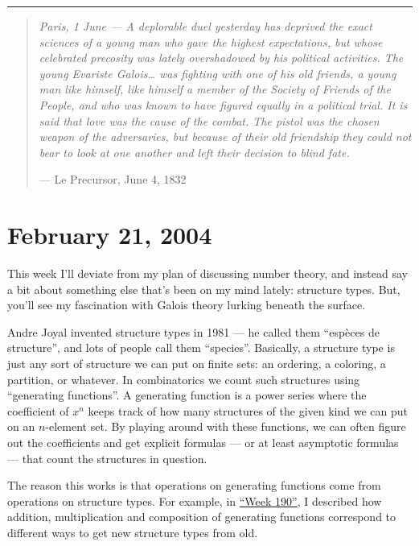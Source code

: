 \documentclass{article}
\begin{document}
\begin{center}\rule{0.5\linewidth}{0.5pt}\end{center}

\begin{quote}
\emph{Paris, 1 June --- A deplorable duel yesterday has deprived the
exact sciences of a young man who gave the highest expectations, but
whose celebrated precosity was lately overshadowed by his political
activities. The young Evariste Galois\ldots{} was fighting with one of
his old friends, a young man like himself, like himself a member of the
Society of Friends of the People, and who was known to have figured
equally in a political trial. It is said that love was the cause of the
combat. The pistol was the chosen weapon of the adversaries, but because
of their old friendship they could not bear to look at one another and
left their decision to blind fate.}

--- Le Precursor, June 4, 1832
\end{quote}



\hypertarget{week202}{%
\section{February 21, 2004}\label{week202}}

This week I'll deviate from my plan of discussing number theory, and
instead say a bit about something else that's been on my mind lately:
structure types. But, you'll see my fascination with Galois theory
lurking beneath the surface.

Andre Joyal invented structure types in 1981 --- he called them
``espèces de structure'', and lots of people call them ``species''.
Basically, a structure type is just any sort of structure we can put on
finite sets: an ordering, a coloring, a partition, or whatever. In
combinatorics we count such structures using ``generating functions''. A
generating function is a power series where the coefficient of \(x^n\)
keeps track of how many structures of the given kind we can put on an
\(n\)-element set. By playing around with these functions, we can often
figure out the coefficients and get explicit formulas --- or at least
asymptotic formulas --- that count the structures in question.

The reason this works is that operations on generating functions come
from operations on structure types. For example, in
\protect\hyperlink{week190}{``Week 190''}, I described how addition,
multiplication and composition of generating functions correspond to
different ways to get new structure types from old.
\end{document}
